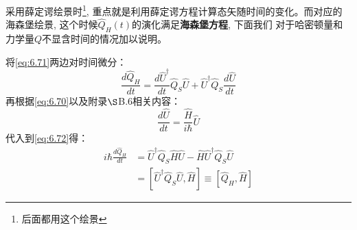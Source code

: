 采用薛定谔绘景时\footnote{后面都用这个绘景}, 重点就是利用薛定谔方程计算态矢随时间的变化。而对应的海森堡绘景, 这个时候$\hat{Q}_H(t)$的演化满足\textbf{海森堡方程}, 下面我们
对于哈密顿量和力学量$Q$不显含时间的情况加以说明。

将\ref{eq:6.71}两边对时间微分：
\begin{equation}
    \label{eq:6.72}
    \frac{d\hat{Q}_H}{dt}=\frac{d\hat{U}^\dagger}{dt}\hat{Q}_S\hat{U}+\hat{U}^\dagger\hat{Q}_S\frac{d\hat{U}}{dt}
\end{equation}
再根据\ref{eq:6.70}以及附录$\S$B.6相关内容：
\begin{equation}
    \frac{d\hat{U}}{dt}=\frac{\hat{H}}{i\hbar}\hat{U}
\end{equation}
代入到\ref{eq:6.72}得：
\begin{align*}
    i\hbar\frac{d\hat{Q}_H}{dt}&=\hat{U}^\dagger\hat{Q}_S\hat{H}\hat{U}-\hat{H}\hat{U}^\dagger\hat{Q}_S\hat{U}\\
    &=\left[\hat{U}^\dagger\hat{Q}_S\hat{U},\hat{H}\right]\equiv\left[\hat{Q}_H,\hat{H}\right]
\end{align*}

